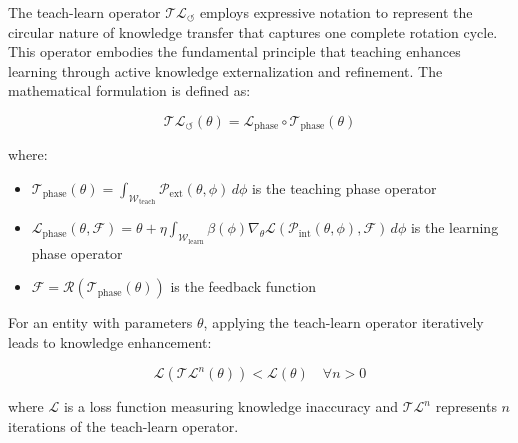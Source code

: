 \begin{definition}
The teach-learn operator $\mathcal{T}\mathcal{L}_{\circlearrowleft}$ employs expressive notation to represent the circular nature of knowledge transfer that captures one complete rotation cycle. This operator embodies the fundamental principle that teaching enhances learning through active knowledge externalization and refinement. The mathematical formulation is defined as:

\begin{equation}
\mathcal{T}\mathcal{L}_{\circlearrowleft}(\theta) = \mathcal{L}_{\text{phase}} \circ \mathcal{T}_{\text{phase}}(\theta)
\end{equation}

where:
\begin{itemize}
    \item $\mathcal{T}_{\text{phase}}(\theta) = \int_{\mathcal{W}_{\text{teach}}} \mathcal{P}_{\text{ext}}(\theta, \phi) \, d\phi$ is the teaching phase operator
    \item $\mathcal{L}_{\text{phase}}(\theta, \mathcal{F}) = \theta + \eta \int_{\mathcal{W}_{\text{learn}}} \beta(\phi) \nabla_{\theta} \mathcal{L}(\mathcal{P}_{\text{int}}(\theta, \phi), \mathcal{F}) \, d\phi$ is the learning phase operator
    \item $\mathcal{F} = \mathcal{R}(\mathcal{T}_{\text{phase}}(\theta))$ is the feedback function
\end{itemize}
\end{definition}

\begin{theorem}
For an entity with parameters $\theta$, applying the teach-learn operator iteratively leads to knowledge enhancement:

\begin{equation}
\mathcal{L}(\mathcal{TL}^n(\theta)) < \mathcal{L}(\theta) \quad \forall n > 0
\end{equation}

where $\mathcal{L}$ is a loss function measuring knowledge inaccuracy and $\mathcal{TL}^n$ represents $n$ iterations of the teach-learn operator.
\end{theorem}

